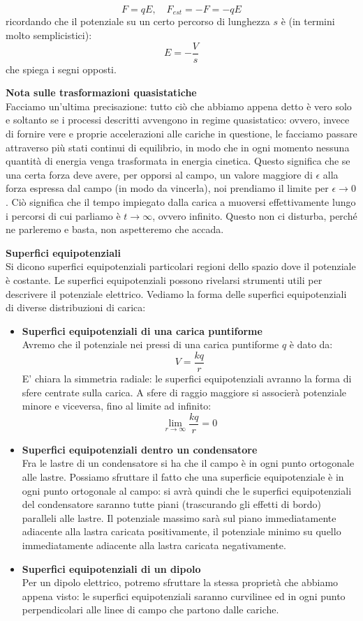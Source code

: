 \documentclass[a4paper,12pt]{article}
\begin{document}
$$ F = qE, \quad F_{est} = -F = -qE $$
ricordando che il potenziale su un certo percorso di lunghezza $s$ è (in termini molto semplicistici):
$$ E = -\frac{V}{s} $$
che spiega i segni opposti. \\
\par\smallskip
\textbf{Nota sulle trasformazioni quasistatiche} \\
Facciamo un'ultima precisazione: tutto ciò che abbiamo appena detto è vero solo e soltanto se i processi descritti avvengono in regime quasistatico: ovvero, invece di fornire vere e proprie accelerazioni alle cariche in questione,
le facciamo passare attraverso più stati continui di equilibrio, in modo che in ogni momento nessuna quantità di energia venga trasformata in energia cinetica. Questo significa che se una certa forza deve avere, per opporsi al campo, un valore maggiore di $\epsilon$ alla forza espressa dal campo (in modo da vincerla), noi prendiamo il limite per $\epsilon \rightarrow 0$. Ciò significa che il tempo impiegato dalla carica a muoversi effettivamente lungo i percorsi
di cui parliamo è $t \rightarrow \infty$, ovvero infinito. Questo non ci disturba, perché ne parleremo e basta, non aspetteremo che accada.
\par\smallskip
\textbf{Superfici equipotenziali} \\
Si dicono superfici equipotenziali particolari regioni dello spazio dove il potenziale è costante. Le superfici equipotenziali possono rivelarsi strumenti utili per descrivere il potenziale elettrico. Vediamo la forma delle superfici equipotenziali
di diverse distribuzioni di carica:
\begin{itemize}
  \item \textbf{Superfici equipotenziali di una carica puntiforme} \\
    Avremo che il potenziale nei pressi di una carica puntiforme $q$ è dato da:
    $$ V = \frac{kq}{r} $$
    E' chiara la simmetria radiale: le superfici equipotenziali avranno la forma di sfere centrate sulla carica. A sfere di raggio maggiore si associerà potenziale minore e viceversa, fino al limite ad infinito:
    $$ \lim_{r\rightarrow\infty} \frac{kq}{r} = 0 $$
  \item \textbf{Superfici equipotenziali dentro un condensatore} \\
    Fra le lastre di un condensatore si ha che il campo è in ogni punto ortogonale alle lastre. Possiamo sfruttare il fatto che una superficie equipotenziale è in ogni punto ortogonale al campo: si avrà quindi che le superfici
    equipotenziali del condensatore saranno tutte piani (trascurando gli effetti di bordo) paralleli alle lastre. Il potenziale massimo sarà sul piano immediatamente adiacente alla lastra caricata positivamente, il potenziale minimo
    su quello immediatamente adiacente alla lastra caricata negativamente.
  \item \textbf{Superfici equipotenziali di un dipolo} \\
    Per un dipolo elettrico, potremo sfruttare la stessa proprietà che abbiamo appena visto: le superfici equipotenziali saranno curvilinee ed in ogni punto perpendicolari alle linee di campo che partono dalle cariche.
\end{itemize}
\end{document}
